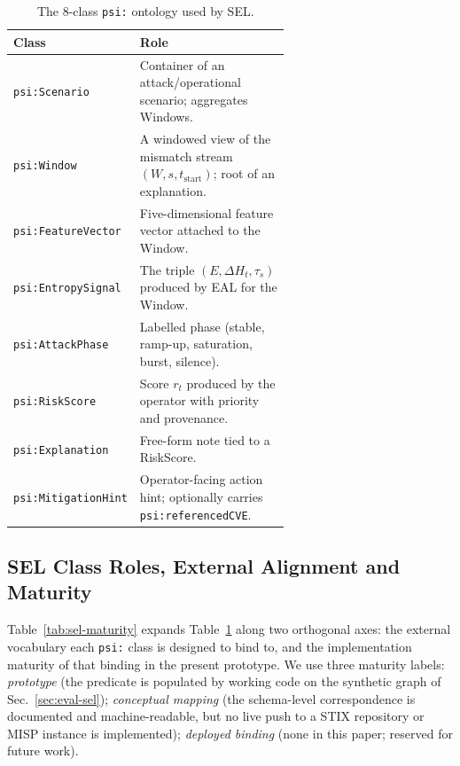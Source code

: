 \documentclass[runningheads]{llncs}
\newcommand{\EntropyDeviation}{\ensuremath{\Delta H}}
\newcommand{\taus}{\ensuremath{\tau_{s}}}
\begin{document}
\begin{table}[t]
\centering
\caption{The 8-class \texttt{psi:} ontology used by SEL.}
\label{tab:ontology}
\small
\begin{tabular}{@{}lp{0.62\linewidth}@{}}
\toprule
\textbf{Class} & \textbf{Role} \\
\midrule
\texttt{psi:Scenario}      & Container of an attack/operational
                             scenario; aggregates Windows. \\
\texttt{psi:Window}        & A windowed view of the mismatch stream
                             $(W, s, t_{\mathrm{start}})$; root of an
                             explanation. \\
\texttt{psi:FeatureVector} & Five-dimensional feature vector attached to
                             the Window. \\
\texttt{psi:EntropySignal} & The triple $(E, \EntropyDeviation_t, \taus)$ produced by
                             EAL for the Window. \\
\texttt{psi:AttackPhase}   & Labelled phase (stable, ramp-up,
                             saturation, burst, silence). \\
\texttt{psi:RiskScore}     & Score $r_t$ produced by the operator with
                             priority and provenance. \\
\texttt{psi:Explanation}   & Free-form note tied to a RiskScore. \\
\texttt{psi:MitigationHint}& Operator-facing action hint; optionally
                             carries \texttt{psi:referencedCVE}. \\
\bottomrule
\end{tabular}
\end{table}

\subsection{SEL Class Roles, External Alignment and Maturity}
\label{sec:sel-maturity}

Table~\ref{tab:sel-maturity} expands Table~\ref{tab:ontology} along two
orthogonal axes: the external vocabulary each \texttt{psi:} class is
designed to bind to, and the implementation maturity of that binding in
the present prototype. We use three maturity labels:
\emph{prototype} (the predicate is populated by working code on the
synthetic graph of Sec.~\ref{sec:eval-sel}); \emph{conceptual mapping}
(the schema-level correspondence is documented and machine-readable, but
no live push to a STIX repository or MISP instance is implemented);
\emph{deployed binding} (none in this paper; reserved for future work).
\end{document}
